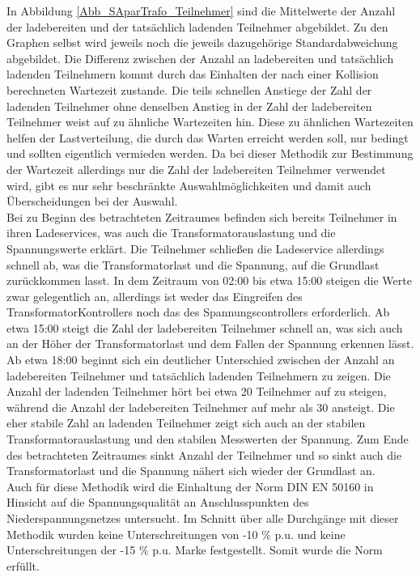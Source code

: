 In Abbildung \ref{Abb_SAparTrafo_Teilnehmer} sind die Mittelwerte der Anzahl der ladebereiten und der tatsächlich ladenden Teilnehmer abgebildet. Zu den Graphen selbst wird jeweils noch die jeweils dazugehörige Standardabweichung abgebildet. Die Differenz zwischen der Anzahl an ladebereiten und tatsächlich ladenden Teilnehmern kommt durch das Einhalten der nach einer Kollision berechneten Wartezeit zustande. Die teils schnellen Anstiege der Zahl der ladenden Teilnehmer ohne denselben Anstieg in der Zahl der ladebereiten Teilnehmer weist auf zu ähnliche Wartezeiten hin. Diese zu ähnlichen Wartezeiten helfen der Lastverteilung, die durch das Warten erreicht werden soll, nur bedingt und sollten eigentlich vermieden werden. Da bei dieser Methodik zur Bestimmung der Wartezeit allerdings nur die Zahl der ladebereiten Teilnehmer verwendet wird, gibt es nur sehr beschränkte Auswahlmöglichkeiten und damit auch Überscheidungen bei der Auswahl.\\
Bei zu Beginn des betrachteten Zeitraumes befinden sich bereits Teilnehmer in ihren Ladeservices, was auch die Transformatorauslastung und die Spannungswerte erklärt. Die Teilnehmer schließen die Ladeservice allerdings schnell ab, was die Transformatorlast und die Spannung, auf die Grundlast zurückkommen lasst. In dem Zeitraum von 02:00 bis etwa 15:00 steigen die Werte zwar gelegentlich an, allerdings ist weder das Eingreifen des TransformatorKontrollers noch das des Spannungscontrollers erforderlich. Ab etwa 15:00 steigt die Zahl der ladebereiten Teilnehmer schnell an, was sich auch an der Höher der Transformatorlast und dem Fallen der Spannung erkennen lässt. Ab etwa 18:00 beginnt sich ein deutlicher Unterschied zwischen der Anzahl an ladebereiten Teilnehmer und tatsächlich ladenden Teilnehmern zu zeigen. Die Anzahl der ladenden Teilnehmer hört bei etwa 20 Teilnehmer auf zu steigen, während die Anzahl der ladebereiten Teilnehmer auf mehr als 30 ansteigt. Die eher stabile Zahl an ladenden Teilnehmer zeigt sich auch an der stabilen Transformatorauslastung und den stabilen Messwerten der Spannung. Zum Ende des betrachteten Zeitraumes sinkt Anzahl der Teilnehmer und so sinkt auch die Transformatorlast und die Spannung nähert sich wieder der Grundlast an.\\
Auch für diese Methodik wird die Einhaltung der Norm DIN EN 50160 in Hinsicht auf die Spannungsqualität an Anschlusspunkten des Niederspannungsnetzes untersucht. Im Schnitt über alle Durchgänge mit dieser Methodik wurden keine Unterschreitungen von -10 \% p.u. und keine Unterschreitungen der -15 \% p.u. Marke festgestellt. Somit wurde die Norm erfüllt.
